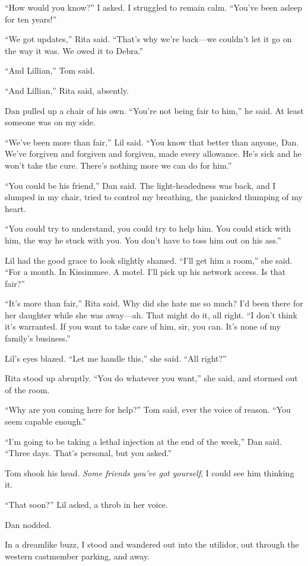 “How would you know?” I asked. I struggled to remain calm. “You've
been asleep for ten years!”

“We got updates,” Rita said. “That's why we're back—we couldn't let
it go on the way it was. We owed it to Debra.”

“And Lillian,” Tom said.

“And Lillian,” Rita said, absently.

Dan pulled up a chair of his own. “You're not being fair to him,”
he said. At least someone was on my side.

“We've been more than fair,” Lil said. “You know that better than
anyone, Dan. We've forgiven and forgiven and forgiven, made every
allowance. He's sick and he won't take the cure. There's nothing
more we can do for him.”

“You could be his friend,” Dan said. The light-headedness was back,
and I slumped in my chair, tried to control my breathing, the
panicked thumping of my heart.

“You could try to understand, you could try to help him. You could
stick with him, the way he stuck with you. You don't have to toss
him out on his ass.”

Lil had the good grace to look slightly shamed. “I'll get him a
room,” she said. “For a month. In Kissimmee. A motel. I'll pick up
his network access. Is that fair?”

“It's more than fair,” Rita said. Why did she hate me so much? I'd
been there for her daughter while she was away—ah. That might do
it, all right. “I don't think it's warranted. If you want to take
care of him, sir, you can. It's none of my family's business.”

Lil's eyes blazed. “Let me handle this,” she said. “All right?”

Rita stood up abruptly. “You do whatever you want,” she said, and
stormed out of the room.

“Why are you coming here for help?” Tom said, ever the voice of
reason. “You seem capable enough.”

“I'm going to be taking a lethal injection at the end of the week,”
Dan said. “Three days. That's personal, but you asked.”

Tom shook his head. \emph{Some friends you've got yourself}, I
could see him thinking it.

“That soon?” Lil asked, a throb in her voice.

Dan nodded.

In a dreamlike buzz, I stood and wandered out into the utilidor,
out through the western castmember parking, and away.

